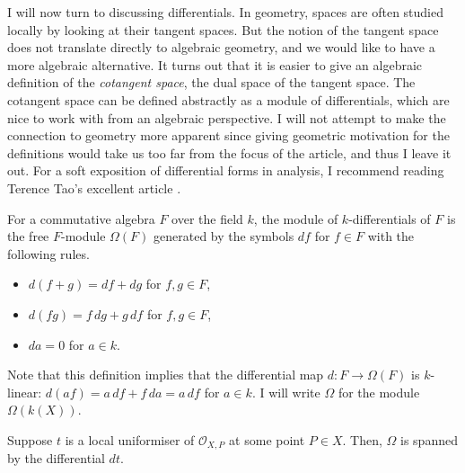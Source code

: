 I will now turn to discussing differentials. In geometry, spaces are often
studied locally by looking at their tangent spaces. But the notion of
the tangent space does not translate directly to algebraic geometry,
and we would like to have a more algebraic alternative. It turns out that it
is easier to give an algebraic definition of the \emph{cotangent space},
the dual space of the tangent space. The cotangent space can be defined
abstractly as a module of differentials, which are nice to work with from
an algebraic perspective. I will not attempt to make the connection to
geometry more apparent since giving geometric motivation for the definitions
would take us too far from the focus of the article, and thus I leave it out.
For a soft exposition of differential forms in analysis, I recommend reading
Terence Tao's excellent article \cite{tao}.
\begin{defin}
  For a commutative algebra $F$ over the field $k$, the module of
  $k$-differentials of $F$ is the free $F$-module $\Omega(F)$ generated
  by the symbols $df$ for $f\in F$ with the following rules.
  \begin{itemize}
    \item $d(f+g)=df+dg$ for $f, g\in F$,
    \item $d(fg)=f\,dg+g\,df$ for $f, g\in F$,
    \item $da = 0$ for $a\in k$.
  \end{itemize}
\end{defin}
Note that this definition implies that the differential map $d:F\to\Omega(F)$
is $k$-linear: $d(af)=a\,df+f\,da=a\,df$ for $a\in k$. I will write
$\Omega$ for the module $\Omega\left(k(X)\right)$.
\begin{prop}
  Suppose $t$ is a local uniformiser of $\mathscr{O}_{X,P}$ at some
  point $P\in X$. Then, $\Omega$ is spanned by the differential $dt$.
\end{prop}
